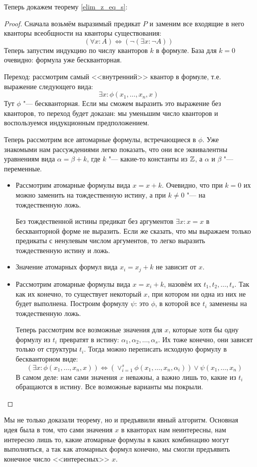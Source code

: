 Теперь докажем теорему \ref{elim_z_eq_s}:
\begin{proof}
	Сначала возьмём выразимый предикат $P$ и заменим все входящие в него кванторы всеобщности на кванторы существования:
	\[ (\forall x \colon A) \iff (\lnot(\exists x \colon \lnot A)) \]
	Теперь запустим индукцию по числу кванторов $k$ в формуле.
	База для $k=0$ очевидно: формула уже бескванторная.

	Переход: рассмотрим самый <<внутренний>> квантор в формуле, т.е. выражение следующего вида:
	\[ \exists x \colon \phi(x_1, \dots, x_n, x) \]
	Тут $\phi$ "--- бескванторная.
	Если мы сможем выразить это выражение без кванторов, то переход будет доказан: мы уменьшим число кванторов и воспользуемся индукционным предположением.

	Теперь рассмотрим все автомарные формулы, встречающиеся в $\phi$.
	Уже знакомыми нам рассуждениями легко показать, что они все эквивалентны уравнениям вида $\alpha = \beta + k$, где $k$ "--- какие-то константы из $\mathbb{Z}$, а $\alpha$ и $\beta$ "--- переменные.
	\begin{itemize}
	\item
		Рассмотрим атомарные формулы вида $x = x + k$.
		Очевидно, что при $k=0$ их можно заменить на тождественную истину, а при $k \neq 0$ "--- на тождественную ложь.
		\begin{Rem}
			Без тождественной истины предикат без аргументов $\exists x \colon x=x$ в бескванторной форме не выразить.
			Если же сказать, что мы выражаем только предикаты с ненулевым числом аргументов, то легко выразить тождественную истину и ложь.
		\end{Rem}
	\item
		Значение атомарных формул вида $x_i = x_j + k$ не зависит от $x$.
	\item
		Рассмотрим атомарные формулы вида $x = x_i + k$, назовём их $t_1, t_2, \dots, t_s$.
		Так как их конечно, то существует некоторый $x$, при котором ни одна из них не будет выполнена.
		Построим формулу $\psi$: это $\phi$, в которой все $t_i$ заменены на тождественную ложь.

		Теперь рассмотрим все возможные значения для $x$, которые хотя бы одну формулу из $t_i$ превратят в истину: $\alpha_1, \alpha_2, \dots, \alpha_s$.
		Их тоже конечно, они зависят только от структуры $t_i$.
		Тогда можно переписать исходную формулу в бескванторном виде:
		\[ (\exists x \colon \phi(x_1, \dots, x_n, x)) \iff (\lor_{i=1}^s \phi(x_1, \dots, x_n, \alpha_i)) \lor \psi(x_1, \dots, x_n) \]
		В самом деле: нам сами значения $x$ неважны, а важно лишь то, какие из $t_i$ обращаются в истину.
		Все возможные варианты мы покрыли.
	\end{itemize}
\end{proof}
\begin{Rem}
	Мы не только доказали теорему, но и предъявили явный алгоритм.
	Основная идея была в том, что сами значения $x$ в кванторах нам неинтересны, нам интересно лишь то, какие
	атомарные формулы в каких комбинацию могут выполняться, а так как атомарных формул конечно, мы смогли предъявить конечное число <<интересных>> $x$.
\end{Rem}

